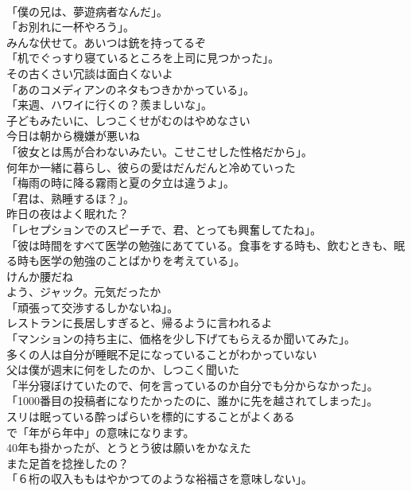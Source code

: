 \documentclass[8pt]{extreport}
\begin{document}
\begin{CJK}{UTF8}{min}
\\	「僕の兄は、夢遊病者なんだ」。	
\\	「お別れに一杯やろう」。	
\\	みんな伏せて。あいつは銃を持ってるぞ	
\\	「机でぐっすり寝ているところを上司に見つかった」。	
\\	その古くさい冗談は面白くないよ	
\\	「あのコメディアンのネタもつきかかっている」。	
\\	「来週、ハワイに行くの？羨ましいな」。	
\\	子どもみたいに、しつこくせがむのはやめなさい	
\\	今日は朝から機嫌が悪いね	
\\	「彼女とは馬が合わないみたい。こせこせした性格だから」。	
\\	何年か一緒に暮らし、彼らの愛はだんだんと冷めていった	
\\	「梅雨の時に降る霧雨と夏の夕立は違うよ」。	
\\	「君は、熟睡するほ？」。	
\\	昨日の夜はよく眠れた？	
\\	「レセプションでのスピーチで、君、とっても興奮してたね」。	
\\	「彼は時間をすべて医学の勉強にあてている。食事をする時も、飲むときも、眠る時も医学の勉強のことばかりを考えている」。	
\\	けんか腰だね	
\\	よう、ジャック。元気だったか	
\\	「頑張って交渉するしかないね」。	
\\	レストランに長居しすぎると、帰るように言われるよ	
\\	「マンションの持ち主に、価格を少し下げてもらえるか聞いてみた」。	
\\	多くの人は自分が睡眠不足になっていることがわかっていない	
\\	父は僕が週末に何をしたのか、しつこく聞いた	
\\	「半分寝ぼけていたので、何を言っているのか自分でも分からなかった」。	
\\	「1000番目の投稿者になりたかったのに、誰かに先を越されてしまった」。	
\\	スリは眠っている酔っぱらいを標的にすることがよくある	
\\	で「年がら年中」の意味になります。	
\\	40年も掛かったが、とうとう彼は願いをかなえた	
\\	また足首を捻挫したの？	
\\	「６桁の収入ももはやかつてのような裕福さを意味しない」。	

\end{CJK}
\end{document}
